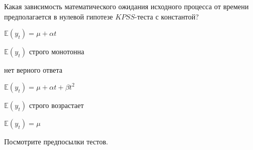 
\begin{question}
Какая зависимость математического ожидания исходного процесса от времени предполагается в нулевой гипотезе \(KPSS\)-теста с константой?
\begin{answerlist}
  \item \(\mathbb{E}(y_t) = \mu + \alpha t\)
  \item \(\mathbb{E}(y_t)\) строго монотонна
  \item нет верного ответа
  \item \(\mathbb{E}(y_t) = \mu + \alpha t + \beta t^2\)
  \item \(\mathbb{E}(y_t)\) строго возрастает
  \item \(\mathbb{E}(y_t) = \mu\)
\end{answerlist}
\end{question}

\begin{solution}
Посмотрите предпосылки тестов.
\end{solution}


